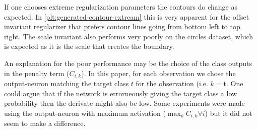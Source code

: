 If one chooses extreme regularization parameters the contours do change as expected. In \cref{plt:generated-contour-extream} this is very apparent for the offset invariant regularizer that prefers contour lines going from bottom left to top right. The scale invariant also performs very poorly on the circles dataset, which is expected as it is the scale that creates the boundary.

An explanation for the poor performance may be the choice of the class outputs in the penalty term ($C_{i,k}$). In this paper, for each observation we chose the output-neuron matching the target class $t$ for the observation (i.e. $k=$t. One could argue that if the network is errorneously giving the target class a low probability then the derivate might also be low. Some experiments were made using the output-neuron with maximum activation ($\max_k C_{i,k} \forall i$) but it did not seem to make a difference.
